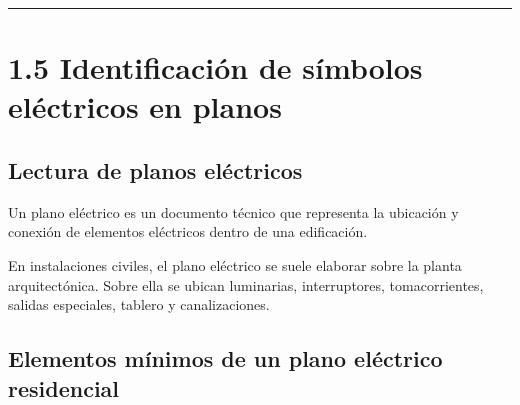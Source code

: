 \documentclass[
  spanish,
  letterpaper,
  DIV=11,
  numbers=noendperiod]{scrreprt}
\begin{document}
\begin{center}\rule{0.5\linewidth}{0.5pt}\end{center}

\section{1.5 Identificación de símbolos eléctricos en
planos}\label{identificaciuxf3n-de-suxedmbolos-eluxe9ctricos-en-planos}

\subsection{Lectura de planos
eléctricos}\label{lectura-de-planos-eluxe9ctricos}

Un plano eléctrico es un documento técnico que representa la ubicación y
conexión de elementos eléctricos dentro de una edificación.

En instalaciones civiles, el plano eléctrico se suele elaborar sobre la
planta arquitectónica. Sobre ella se ubican luminarias, interruptores,
tomacorrientes, salidas especiales, tablero y canalizaciones.

\subsection{Elementos mínimos de un plano eléctrico
residencial}\label{elementos-muxednimos-de-un-plano-eluxe9ctrico-residencial}
\end{document}
